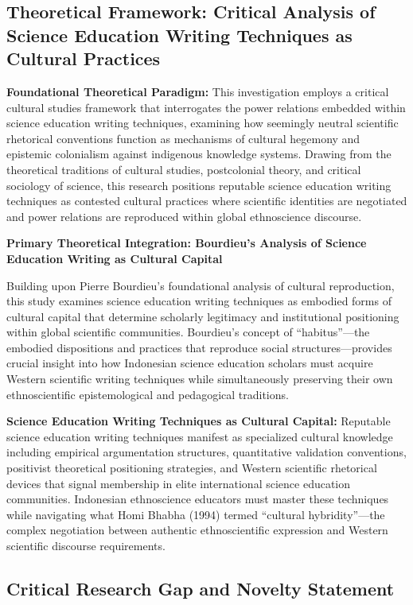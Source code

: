 \documentclass[journal,article,submit,pdftex,moreauthors]{Definitions/mdpi}
\begin{document}
\subsection{Theoretical Framework: Critical Analysis of Science Education Writing Techniques as Cultural Practices}

\textbf{Foundational Theoretical Paradigm:} This investigation employs a critical cultural studies framework that interrogates the power relations embedded within science education writing techniques, examining how seemingly neutral scientific rhetorical conventions function as mechanisms of cultural hegemony and epistemic colonialism against indigenous knowledge systems. Drawing from the theoretical traditions of cultural studies, postcolonial theory, and critical sociology of science, this research positions reputable science education writing techniques as contested cultural practices where scientific identities are negotiated and power relations are reproduced within global ethnoscience discourse.

\textbf{Primary Theoretical Integration: Bourdieu's Analysis of Science Education Writing as Cultural Capital}

Building upon Pierre Bourdieu's foundational analysis of cultural reproduction, this study examines science education writing techniques as embodied forms of cultural capital that determine scholarly legitimacy and institutional positioning within global scientific communities. Bourdieu's concept of ``habitus''—the embodied dispositions and practices that reproduce social structures—provides crucial insight into how Indonesian science education scholars must acquire Western scientific writing techniques while simultaneously preserving their own ethnoscientific epistemological and pedagogical traditions.

\textbf{Science Education Writing Techniques as Cultural Capital:}
Reputable science education writing techniques manifest as specialized cultural knowledge including empirical argumentation structures, quantitative validation conventions, positivist theoretical positioning strategies, and Western scientific rhetorical devices that signal membership in elite international science education communities. Indonesian ethnoscience educators must master these techniques while navigating what Homi Bhabha (1994) termed ``cultural hybridity''—the complex negotiation between authentic ethnoscientific expression and Western scientific discourse requirements.

\subsection{Critical Research Gap and Novelty Statement}
\end{document}
